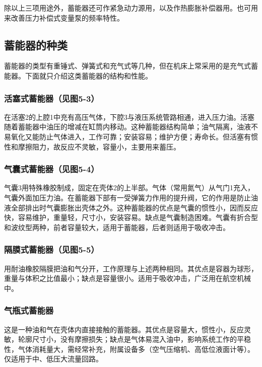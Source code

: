 除以上三项用途外，蓄能器还可作紧急动力源用，以及作热膨胀补偿器用。也可用来改善压力补偿式变量泵的频率特性。

\subsection{蓄能器的种类}

蓄能器的类型有重锤式、弹簧式和充气式等几种，但在机床上常采用的是充气式蓄能器。下面就只介绍这类蓄能器的结构和性能。

\subsubsection{活塞式蓄能器（见图5-3）}

在活塞2的上腔1中充有高压气体，下腔3与液压系统管路相通，进入压力油。活塞随着蓄能器中油压的增减在缸筒内移动。这种蓄能器结构简单；油气隔离，油液不易氧化又能防止气体进入，工作可靠；安装容易；维护方便；寿命长。但活塞有惯性和摩擦阻力，故反应不灵敏，容量小，主要用来蓄压。

\subsubsection{气囊式蓄能器（见图5-4）}

气囊3用特殊橡胶制成，固定在壳体2的上半部。气体（常用氮气）从气门1充入，气囊外面加压力油。在蓄能器下部有一受弹簧力作用的提升阀，它的作用是防止油液全部排出时气囊膨胀出壳体之外。这种蓄能器的优点是气囊的惯性小，因而反应快，容易维护，重量轻，尺寸小，安装容易。缺点是气囊制造困难。气囊有折合型和波纹型两种，前者容量较大，适用于蓄能器，后者则适用于吸收冲击。

\subsubsection{隔膜式蓄能器（见图5-5）}

用耐油橡胶隔膜把油和气分开，工作原理与上述两种相同。其优点是容器为球形，重量与体积之比值最小；缺点是容量很小。适用于吸收冲击，广泛用在航空机械中。

\subsubsection{气瓶式蓄能器}

这是一种油和气在壳体内直接接触的蓄能器。其优点是容量大，惯性小，反应灵敏，轮廓尺寸小，没有摩擦损失；缺点是气体易混入油中，影响系统工作的平稳性，气体消耗量大，需经常补充，附属设备多（空气压缩机、高低位液面计等）。仅适用于中、低压大流量回路。

